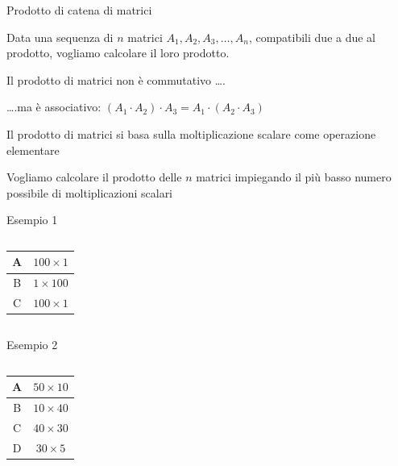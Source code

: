 \begin{frame}{Prodotto di catena di matrici}

\vspace{-6pt}
\begin{myboxtitle}[Problema]
Data una sequenza di $n$ matrici $A_1, A_2, A_3, \ldots, A_n$, compatibili due a due al prodotto, vogliamo calcolare il loro prodotto.
\BIL
\item  Il prodotto di matrici non è \alert{commutativo} \ldots .
\item  \ldots .ma è \alert{associativo}: $(A_1 \cdot A_2) \cdot A_3 = A_1 \cdot (A_2 \cdot A_3)$ 
\EIL
\end{myboxtitle}

\BIL
\item Il prodotto di matrici si basa sulla \alert{moltiplicazione scalare} come operazione elementare
\item Vogliamo calcolare il prodotto delle $n$ matrici impiegando il più basso numero possibile di moltiplicazioni scalari
\EIL

\end{frame}

\begin{frame}{Esempio 1}
    
\vspace{-6pt}
\begin{columns}[T]
\begingroup
\setlength\arrayrulewidth{1pt}
\begin{tabular}{|c|c|}
\hline
A & $100 \times 1$ \\\hline
B & $1 \times 100$ \\\hline
C & $100 \times 1$ \\\hline
\end{tabular}    
\endgroup
{}
\vspace{-16pt}    
\end{columns}

\end{frame}

\begin{frame}{Esempio 2}

\vspace{-6pt}
\begin{columns}[T]
\begingroup
\setlength\arrayrulewidth{1pt}
\begin{tabular}{|c|c|}
\hline
A & $50 \times 10$ \\\hline
B & $10 \times 40$ \\\hline
C & $40 \times 30$ \\\hline
D & $30 \times 5$ \\\hline
\end{tabular}    
\endgroup
{}
\vspace{-16pt}    
\end{columns}

\end{frame}


